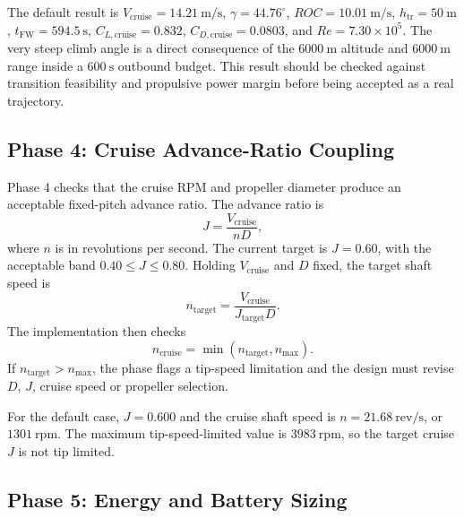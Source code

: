 The default result is \(V_{\mathrm{cruise}}=14.21~\mathrm{m/s}\), \(\gamma=44.76^\circ\), \(ROC=10.01~\mathrm{m/s}\), \(h_{\mathrm{tr}}=50~\mathrm{m}\), \(t_{\mathrm{FW}}=594.5~\mathrm{s}\), \(C_{L,\mathrm{cruise}}=0.832\), \(C_{D,\mathrm{cruise}}=0.0803\), and \(Re=7.30\times10^5\). The very steep climb angle is a direct consequence of the \(6000~\mathrm{m}\) altitude and \(6000~\mathrm{m}\) range inside a \(600~\mathrm{s}\) outbound budget. This result should be checked against transition feasibility and propulsive power margin before being accepted as a real trajectory.

\subsection{Phase 4: Cruise Advance-Ratio Coupling}
\label{subsec:ppa_phase4}

Phase 4 checks that the cruise RPM and propeller diameter produce an acceptable fixed-pitch advance ratio. The advance ratio is
\begin{equation}
    J = \frac{V_{\mathrm{cruise}}}{nD},
    \label{eq:ppa_advance_ratio}
\end{equation}
where \(n\) is in revolutions per second. The current target is \(J=0.60\), with the acceptable band \(0.40\leq J\leq0.80\). Holding \(V_{\mathrm{cruise}}\) and \(D\) fixed, the target shaft speed is
\begin{equation}
    n_{\mathrm{target}} =
    \frac{V_{\mathrm{cruise}}}{J_{\mathrm{target}}D}.
    \label{eq:ppa_n_target}
\end{equation}
The implementation then checks
\begin{equation}
    n_{\mathrm{cruise}}=\min(n_{\mathrm{target}},n_{\max}).
    \label{eq:ppa_n_cruise}
\end{equation}
If \(n_{\mathrm{target}}>n_{\max}\), the phase flags a tip-speed limitation and the design must revise \(D\), \(J\), cruise speed or propeller selection.

For the default case, \(J=0.600\) and the cruise shaft speed is \(n=21.68~\mathrm{rev/s}\), or \(1301~\mathrm{rpm}\). The maximum tip-speed-limited value is \(3983~\mathrm{rpm}\), so the target cruise \(J\) is not tip limited.

\subsection{Phase 5: Energy and Battery Sizing}
\label{subsec:ppa_phase5}

